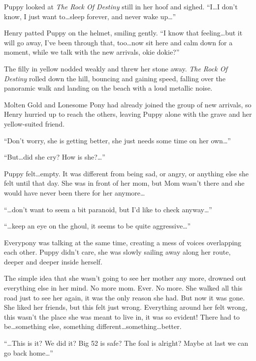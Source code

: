 Puppy looked at \emph{The Rock Of Destiny} still in her hoof and sighed. ``I\dots I don't know, I just want to\dots sleep forever, and never wake up\dots''

Henry patted Puppy on the helmet, smiling gently. ``I know that feeling\dots but it will go away, I've been through that, too\dots now sit here and calm down for a moment, while we talk with the new arrivals, okie dokie?''

The filly in yellow nodded weakly and threw her stone away. \emph{The Rock Of Destiny} rolled down the hill, bouncing and gaining speed, falling over the panoramic walk and landing on the beach with a loud metallic noise.

\horizonline


Molten Gold and Lonesome Pony had already joined the group of new arrivals, so Henry hurried up to reach the others, leaving Puppy alone with the grave and her yellow-suited friend.

``Don't worry, she is getting better, she just needs some time on her own\dots''

``But\dots did she cry? How is she?\dots''

Puppy felt\dots empty. It was different from being sad, or angry, or anything else she felt until that day. She was in front of her mom, but Mom wasn't there and she would have never been there for her anymore\dots

``\dots don't want to seem a bit paranoid, but I'd like to check anyway\dots''

``\dots keep an eye on the ghoul, it seems to be quite aggressive\dots''

Everypony was talking at the same time, creating a mess of voices overlapping each other. Puppy didn't care, she was slowly sailing away along her route, deeper and deeper inside herself.

The simple idea that she wasn't going to see her mother any more, drowned out everything else in her mind. No more mom. Ever. No more. She walked all this road just to see her again, it was the only reason she had. But now it was gone. She liked her friends, but this felt just wrong. Everything around her felt wrong, this wasn't the place she was meant to live in, it was so evident! There had to be\dots something else, something different\dots something\dots better.

``\dots This is it? We did it? Big 52 is safe? The foal is alright? Maybe at last we can go back home\dots''


